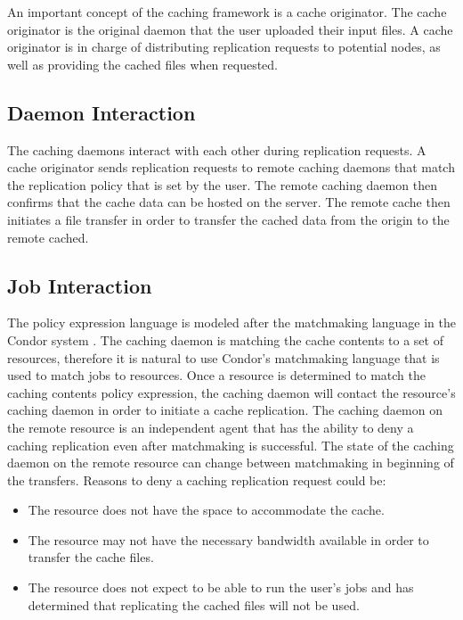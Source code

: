 An important concept of the caching framework is a cache originator.  The cache originator is the original daemon that the user uploaded their input files.  A cache originator is in charge of distributing replication requests to potential nodes, as well as providing the cached files when requested.

\subsection{Daemon Interaction}

The caching daemons interact with each other during replication requests.  A cache originator sends replication requests to remote caching daemons that match the replication policy that is set by the user.  The remote caching daemon then confirms that the cache data can be hosted on the server.  The remote cache then initiates a file transfer in order to transfer the cached data from the origin to the remote cached.


\subsection{Job Interaction}





The policy expression language is modeled after the matchmaking language in the Condor system \cite{raman1998matchmaking}.  The caching daemon is matching the cache contents to a set of resources, therefore it is natural to use Condor's matchmaking language that is used to match jobs to resources.  Once a resource is determined to match the caching contents policy expression, the caching daemon will contact the resource's caching daemon in order to initiate a cache replication.  The caching daemon on the remote resource is an independent agent that has the ability to deny a caching replication even after matchmaking is successful.  The state of the caching daemon on the remote resource can change between matchmaking in beginning of the transfers.  Reasons to deny a caching replication request could be:

\begin{itemize}
\item The resource does not have the space to accommodate the cache.
\item The resource may not have the necessary bandwidth available in order to transfer the cache files.
\item The resource does not expect to be able to run the user's jobs and has determined that replicating the cached files will not be used.
\end{itemize}

